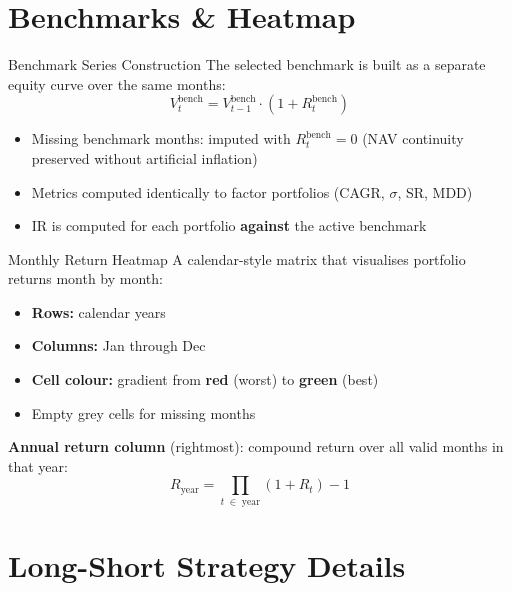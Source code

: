 \documentclass[aspectratio=169, 12pt]{beamer}
\begin{document}
\section{Benchmarks \& Heatmap}

\begin{frame}{Benchmark Series Construction}
  The selected benchmark is built as a separate equity curve over the same months:
  \[
    V_t^{\text{bench}} = V_{t-1}^{\text{bench}} \cdot (1 + R_t^{\text{bench}})
  \]
  \begin{itemize}
    \item Missing benchmark months: imputed with $R_t^{\text{bench}} = 0$ (NAV continuity preserved without artificial inflation)
    \item Metrics computed identically to factor portfolios (CAGR, $\sigma$, SR, MDD)
    \item IR is computed for each portfolio \textbf{against} the active benchmark
  \end{itemize}
\end{frame}

\begin{frame}{Monthly Return Heatmap}
  A calendar-style matrix that visualises portfolio returns month by month:
  \begin{itemize}
    \item \textbf{Rows:} calendar years
    \item \textbf{Columns:} Jan through Dec
    \item \textbf{Cell colour:} gradient from {\color{danger}\textbf{red}} (worst) to {\color{accent}\textbf{green}} (best)
    \item Empty grey cells for missing months
  \end{itemize}

  \medskip
  \textbf{Annual return column} (rightmost): compound return over all valid months in that year:
  \[
    R_{\text{year}} = \prod_{t\;\in\;\text{year}}(1 + R_t) - 1
  \]
\end{frame}

\section{Long-Short Strategy Details}
\end{document}

